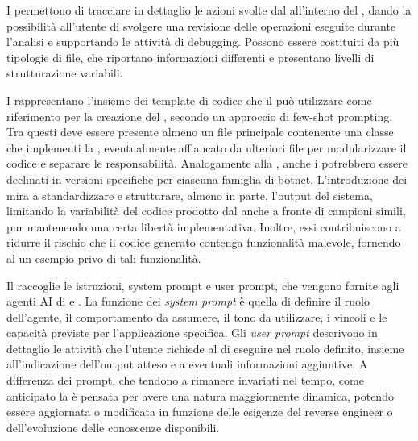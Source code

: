 
I \logs{} permettono di tracciare in dettaglio le azioni svolte dal \llm{} all'interno del \sreagent{}, dando la possibilità all'utente di svolgere una revisione delle operazioni eseguite durante l'analisi e supportando le attività di debugging. Possono essere costituiti da più tipologie di file, che riportano informazioni differenti e presentano livelli di strutturazione variabili.


I \templates{} rappresentano l'insieme dei template di codice che il \codeagent{} può utilizzare come riferimento per la creazione del \capture{}, secondo un approccio di few-shot prompting. Tra questi deve essere presente almeno un file principale contenente una classe che implementi la \interface{}, eventualmente affiancato da ulteriori file per modularizzare il codice e separare le responsabilità. Analogamente alla \kb{}, anche i \templates{} potrebbero essere declinati in versioni specifiche per ciascuna famiglia di botnet. L'introduzione dei \templates{} mira a standardizzare e strutturare, almeno in parte, l'output del sistema, limitando la variabilità del codice prodotto dal \llm{} anche a fronte di campioni simili, pur mantenendo una certa libertà implementativa. Inoltre, essi contribuiscono a ridurre il rischio che il codice generato contenga funzionalità malevole, fornendo al \llm{} un esempio privo di tali funzionalità.


Il \prompt{} raccoglie le istruzioni, system prompt e user prompt, che vengono fornite agli agenti AI di \sreagent{} e \codeagent{}. La funzione dei \emph{system prompt} \cite{dhamani2026genai} è quella di definire il ruolo dell'agente, il comportamento da assumere, il tono da utilizzare, i vincoli e le capacità previste per l'applicazione specifica. Gli \emph{user prompt} \cite{dhamani2026genai} descrivono in dettaglio le attività che l'utente richiede al \llm{} di eseguire nel ruolo definito, insieme all'indicazione dell'output atteso e a eventuali informazioni aggiuntive. A differenza dei prompt, che tendono a rimanere invariati nel tempo, come anticipato la \kb{} è pensata per avere una natura maggiormente dinamica, potendo essere aggiornata o modificata in funzione delle esigenze del reverse engineer o dell'evoluzione delle conoscenze disponibili.
    
